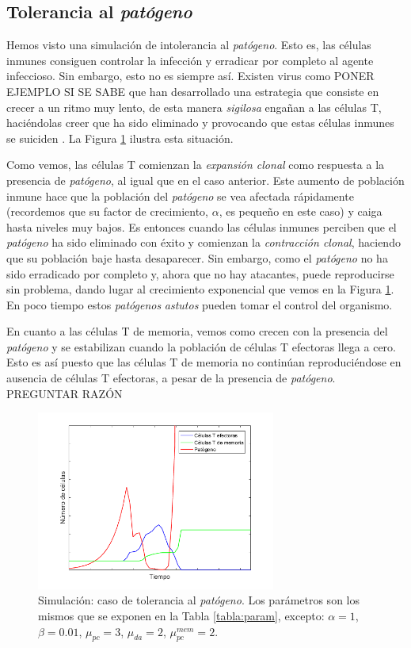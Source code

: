 \subsection{Tolerancia al \textit{patógeno}}
\label{sim:toler}

Hemos visto una simulación de intolerancia al \textit{patógeno}. Esto es, las células inmunes consiguen controlar la infección y erradicar por completo al agente infeccioso. Sin embargo, esto no es siempre así. Existen virus como PONER EJEMPLO SI SE SABE que han desarrollado una estrategia que consiste en crecer a un ritmo muy lento, de esta manera \textit{sigilosa} engañan a las células T, haciéndolas creer que ha sido eliminado y provocando que estas células inmunes se suiciden  \citep{leggett2017growth}. La Figura \ref{fig:tolerance} ilustra esta situación.

Como vemos, las células T comienzan la \textit{expansión clonal} como respuesta a la presencia de \textit{patógeno}, al igual que en el caso anterior. Este aumento de población inmune hace que la población del \textit{patógeno} se vea afectada rápidamente (recordemos que su factor de crecimiento, $\alpha$, es pequeño en este caso) y caiga hasta niveles muy bajos. Es entonces cuando las células inmunes perciben que el \textit{patógeno} ha sido eliminado con éxito y comienzan la \textit{contracción clonal}, haciendo que su población baje hasta desaparecer. Sin embargo, como el \textit{patógeno} no ha sido erradicado por completo y, ahora que no hay atacantes, puede reproducirse sin problema, dando lugar al crecimiento exponencial que vemos en la Figura \ref{fig:tolerance}. En poco tiempo estos \textit{patógenos} \textit{astutos} pueden tomar el control del organismo. 

En cuanto a las células T de memoria, vemos como crecen con la presencia del \textit{patógeno} y se estabilizan cuando la población de células T efectoras llega a cero. Esto es así puesto que las células T de memoria no continúan reproduciéndose en ausencia de células T efectoras, a pesar de la presencia de \textit{patógeno}. PREGUNTAR RAZÓN 

\begin{figure}[t]
	\centering
	\includegraphics[width=0.7\textwidth]{Imagenes/Simulaciones/tolerance}
	\caption{Simulación: caso de tolerancia al \textit{patógeno}. Los parámetros son los mismos que se exponen en la Tabla \ref{tabla:param}, excepto: $\alpha = 1$, $\beta = 0.01$, $\mu_{pc} = 3$, $\mu_{da} = 2$, $\mu_{pc}^{mem} = 2$.}
	\label{fig:tolerance}
\end{figure}

